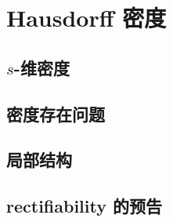 \section{Hausdorff 密度}
\label{b1:sec:1505}


\subsection{\texorpdfstring{\(s\)}{s}-维密度}
\label{b1:subsec:150501}

\subsection{密度存在问题}
\label{b1:subsec:150502}

\subsection{局部结构}
\label{b1:subsec:150503}

\subsection{rectifiability 的预告}
\label{b1:subsec:150504}


